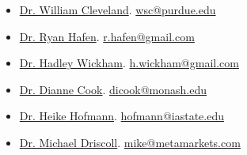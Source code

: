 \documentclass[oneside]{article}
\begin{document}
  \begin{itemize}

    \item \href{http://www.stat.purdue.edu/~wsc/}{Dr. William Cleveland}. \href{mailto:wsc@purdue.edu}{wsc@purdue.edu}

    \item \href{http://ryanhafen.com/}{Dr. Ryan Hafen}. \href{mailto:r.hafen@gmail.com}{r.hafen@gmail.com}

    \item \href{http://had.co.nz/}{Dr. Hadley Wickham}.  \href{mailto:h.wickham@gmail.com}{h.wickham@gmail.com}

    \item \href{http://dicook.github.io/}{Dr. Dianne Cook}.  \href{mailto:dicook@monash.edu}{dicook@monash.edu}

    \item \href{https://github.com/heike}{Dr. Heike Hofmann}.  \href{mailto:hofmann@iastate.edu}{hofmann@iastate.edu}

    \item \href{https://www.linkedin.com/profile/view?id=413949}{Dr. Michael Driscoll}. \href{mailto:mike@metamarkets.com}{mike@metamarkets.com}

  \end{itemize}
\end{document}
